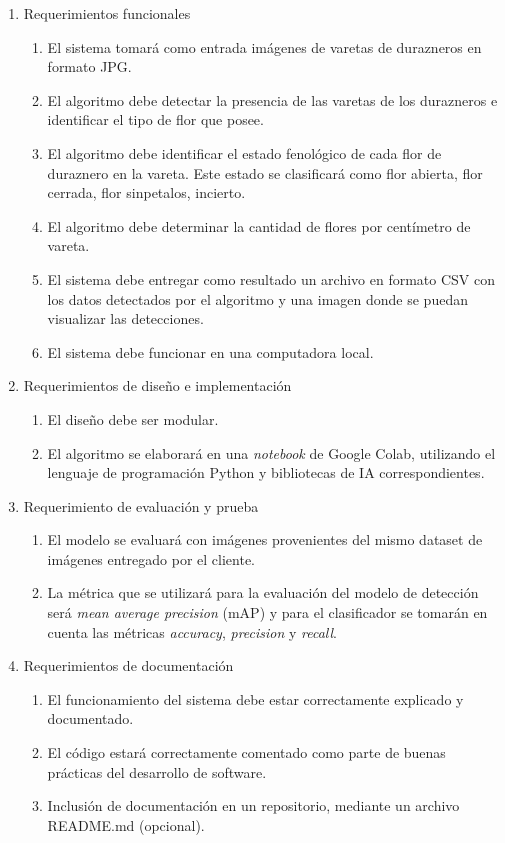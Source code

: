 \begin{enumerate}
	\item Requerimientos funcionales
		\begin{enumerate}
			\item El sistema tomará como entrada imágenes de varetas de durazneros en formato JPG.			
			\item El algoritmo debe detectar la presencia de las varetas de los durazneros e identificar el tipo de flor que posee.			        
			\item El algoritmo debe identificar el estado fenológico de cada flor de duraznero en la vareta. Este estado se clasificará como flor abierta, flor cerrada, flor sinpetalos, incierto.
			\item El algoritmo debe determinar la cantidad de flores por centímetro de vareta.
			\item El sistema debe entregar como resultado un archivo en formato CSV con los datos detectados por el algoritmo y una imagen donde se puedan visualizar las detecciones.
			\item El sistema debe funcionar en una computadora local.
		\end{enumerate}
	\item Requerimientos de diseño e implementación
		\begin{enumerate}
			\item El diseño debe ser modular.
			\item El algoritmo se elaborará en una \textit{notebook} de Google Colab, utilizando el lenguaje de  programación Python y bibliotecas de IA correspondientes. 
		\end{enumerate}
	\item Requerimiento de evaluación y prueba
	\begin{enumerate}
			\item El modelo se evaluará con imágenes provenientes del mismo dataset de imágenes entregado por el cliente.
			 \item La métrica que se utilizará para la evaluación del modelo de detección será \textit{mean average precision} (mAP) y para el clasificador se tomarán en cuenta las métricas \textit{accuracy}, \textit{precision} y \textit{recall}.
		\end{enumerate}
	\item Requerimientos de documentación
	\begin{enumerate}
			\item El funcionamiento del sistema debe estar correctamente explicado y documentado.
			 \item El código estará correctamente comentado como parte de buenas prácticas del desarrollo de software.
			 \item Inclusión de documentación en un repositorio, mediante un archivo README.md (opcional).
		\end{enumerate}
\end{enumerate}

